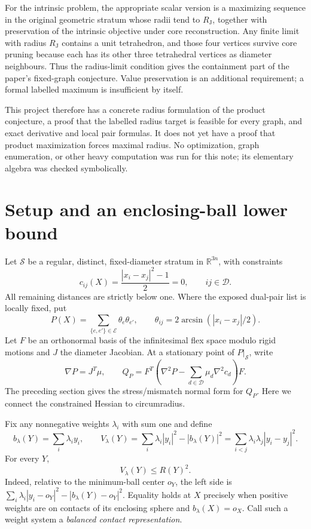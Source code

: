 \documentclass[11pt]{article}
\theoremstyle{remark}\newtheorem{remark}[theorem]{Remark}
\newcommand{\R}{\mathbb R}
\newcommand{\RJ}{R_{\mathrm J}}
\begin{document}
For the intrinsic problem, the appropriate scalar version is a
maximizing sequence in the original geometric stratum whose radii tend
to $\RJ$, together with preservation of the intrinsic objective under
core reconstruction. Any finite limit with radius $\RJ$ contains a
unit tetrahedron, and those four vertices survive core pruning because
each has its other three tetrahedral vertices as diameter neighbours.
Thus the radius-limit condition gives the containment part of the
paper's fixed-graph conjecture. Value preservation is an additional
requirement; a formal labelled maximum is insufficient by itself.

This project therefore has a concrete radius formulation of the product
conjecture, a proof that the labelled radius target is feasible for every
graph, and exact derivative and local pair formulas. It does not yet
have a proof that product maximization forces maximal radius. No
optimization, graph enumeration, or other heavy computation was run
for this note; its elementary algebra was checked symbolically.


\section{Setup and an enclosing-ball lower bound}
Let $\mathcal S$ be a regular, distinct, fixed-diameter stratum in
$\R^{3n}$, with constraints
\[
 c_{ij}(X)=\frac{|x_i-x_j|^2-1}{2}=0,
 \qquad ij\in\mathcal D.
\]
All remaining distances are strictly below one. Where the exposed
dual-pair list is locally fixed, put
\[
 P(X)=\sum_{\{e,e'\}\in\mathcal E}\theta_e\theta_{e'},
 \qquad \theta_{ij}=2\arcsin(|x_i-x_j|/2).
\]
Let $F$ be an orthonormal basis of the infinitesimal flex space modulo
rigid motions and $J$ the diameter Jacobian. At a stationary point of
$P|_{\mathcal S}$, write
\[
 \nabla P=J^T\mu,\qquad
 Q_P=F^T\left(\nabla^2P-\sum_{d\in\mathcal D}\mu_d\nabla^2c_d\right)F.
\]
The preceding section gives the stress/mismatch normal form for $Q_P$.
Here we connect the constrained Hessian to circumradius.

Fix any nonnegative weights $\lambda_i$ with sum one and define
\[
 b_\lambda(Y)=\sum_i\lambda_i y_i,\qquad
 V_\lambda(Y)=\sum_i\lambda_i|y_i|^2-|b_\lambda(Y)|^2
 =\sum_{i<j}\lambda_i\lambda_j|y_i-y_j|^2.
\]
For every $Y$,
\begin{equation}\label{product:variancebound}
 V_\lambda(Y)\leq R(Y)^2.
\end{equation}
Indeed, relative to the minimum-ball center $o_Y$, the left side is
$\sum_i\lambda_i|y_i-o_Y|^2-|b_\lambda(Y)-o_Y|^2$.
Equality holds at $X$ precisely when positive weights are on contacts
of its enclosing sphere and $b_\lambda(X)=o_X$.
Call such a weight system a \emph{balanced contact representation}.
\end{document}
